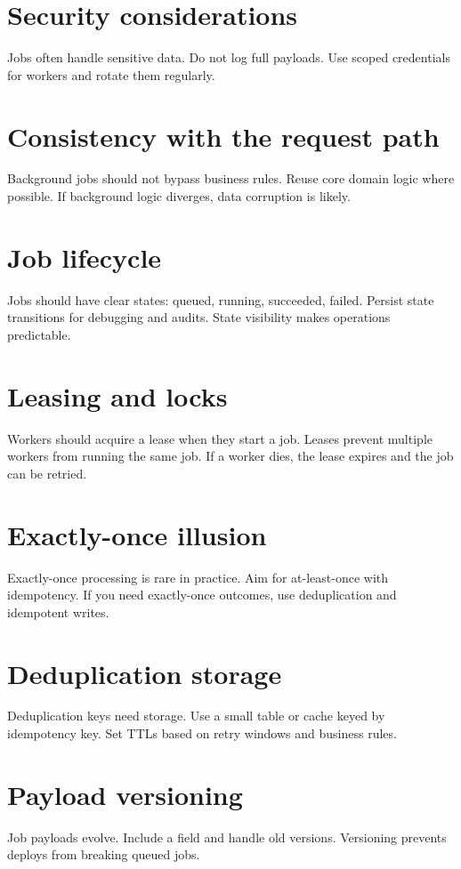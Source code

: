 \section{Security considerations}
Jobs often handle sensitive data.
Do not log full payloads.
Use scoped credentials for workers and rotate them regularly.

\section{Consistency with the request path}
Background jobs should not bypass business rules.
Reuse core domain logic where possible.
If background logic diverges, data corruption is likely.

\section{Job lifecycle}
Jobs should have clear states: queued, running, succeeded, failed.
Persist state transitions for debugging and audits.
State visibility makes operations predictable.

\section{Leasing and locks}
Workers should acquire a lease when they start a job.
Leases prevent multiple workers from running the same job.
If a worker dies, the lease expires and the job can be retried.

\section{Exactly-once illusion}
Exactly-once processing is rare in practice.
Aim for at-least-once with idempotency.
If you need exactly-once outcomes, use deduplication and idempotent writes.

\section{Deduplication storage}
Deduplication keys need storage.
Use a small table or cache keyed by idempotency key.
Set TTLs based on retry windows and business rules.

\section{Payload versioning}
Job payloads evolve.
Include a  field and handle old versions.
Versioning prevents deploys from breaking queued jobs.

